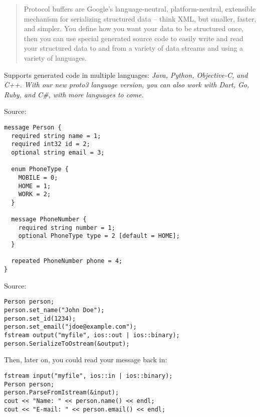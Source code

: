 \documentclass[Screen16to9,17pt]{foils}
\begin{document}
\begin{quote}
Protocol buffers are Google's language-neutral, platform-neutral, extensible mechanism for serializing structured data – think XML, but smaller, faster, and simpler. You define how you want your data to be structured once, then you can use special generated source code to easily write and read your structured data to and from a variety of data streams and using a variety of languages.
\end{quote}


\begin{list2}
\item Supports generated code in multiple languages:
\emph{Java, Python, Objective-C, and C++. With our new proto3 language version, you can also work with Dart, Go, Ruby, and C\#, with more languages to come.}
\end{list2}
Source: {\footnotesize\\
}


\begin{verbatim}
message Person {
  required string name = 1;
  required int32 id = 2;
  optional string email = 3;

  enum PhoneType {
    MOBILE = 0;
    HOME = 1;
    WORK = 2;
  }

  message PhoneNumber {
    required string number = 1;
    optional PhoneType type = 2 [default = HOME];
  }

  repeated PhoneNumber phone = 4;
}
\end{verbatim}


Source:  {\footnotesize\\}


\begin{verbatim}
Person person;
person.set_name("John Doe");
person.set_id(1234);
person.set_email("jdoe@example.com");
fstream output("myfile", ios::out | ios::binary);
person.SerializeToOstream(&output);
\end{verbatim}

Then, later on, you could read your message back in:
\begin{verbatim}
fstream input("myfile", ios::in | ios::binary);
Person person;
person.ParseFromIstream(&input);
cout << "Name: " << person.name() << endl;
cout << "E-mail: " << person.email() << endl;
\end{verbatim}
\end{document}
